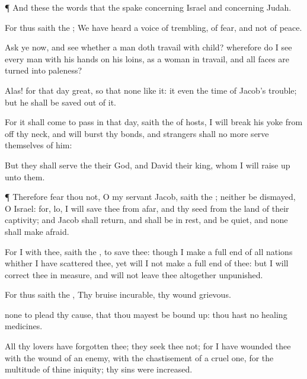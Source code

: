 {\par }{\PP {}¶ And these
{} the
words that the
{}
spake concerning
Israel and concerning
Judah.

For thus
saith the
{}; We have
heard a
voice of
trembling, of
fear, and not of
peace.

Ask ye now, and
see whether a
man doth travail with
child? wherefore do I
see every
man with his
hands on his
loins, as a woman in
travail, and all
faces are
turned into
paleness?

Alas! for that
day
{}
great, so
that none
{} like it: it
{} even the
time of
Jacob’s
trouble; but he shall be
saved out of it.

For it shall come to pass in that
day,
saith the
{} of
hosts,
{} I will
break his
yoke from off thy
neck, and will
burst thy
bonds, and
strangers shall no more
serve themselves of him:

But they shall
serve the
{} their
God, and
David their
king, whom I will raise
up unto them.


\par }{\PP {}¶ Therefore
fear thou not, O my
servant
Jacob,
saith the
{}; neither be
dismayed, O
Israel: for, lo, I will
save thee from
afar, and thy
seed from the
land of their
captivity; and
Jacob shall
return, and shall be in
rest, and be
quiet, and none shall make
{}
afraid.

For I
{} with thee,
saith the
{}, to
save thee: though I
make a full
end of all
nations whither I have
scattered thee, yet will I not
make a full
end of thee: but I will
correct thee in
measure, and will not leave thee
altogether
unpunished.

For thus
saith the
{}, Thy
bruise
{}
incurable,
{} thy
wound
{}
grievous.

 none to
plead thy
cause, that thou mayest be bound
up: thou hast no
healing
medicines.

All thy
lovers have
forgotten thee; they
seek thee not; for I have
wounded thee with the
wound of an
enemy, with the
chastisement of a cruel
one, for the
multitude of thine
iniquity;
{} thy
sins were
increased.

}
